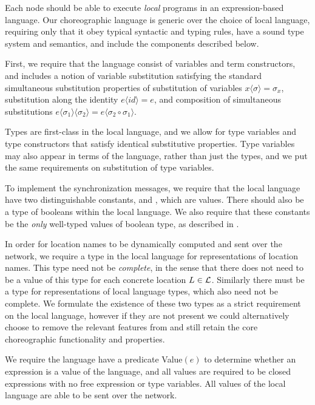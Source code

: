 Each node should be able to execute \emph{local} programs in an expression-based language.
Our choreographic language is generic over the choice of local language, requiring only that it obey typical syntactic and typing rules, have a sound type system and semantics, and include the components described below.

First, we require that the language consist of variables and term constructors, and includes a notion of variable substitution satisfying the standard simultaneous substitution properties of substitution of variables $x \langle \sigma \rangle = \sigma_x$, substitution along the identity $e \langle  id \rangle = e$, and composition of simultaneous substitutions $e \langle \sigma_1 \rangle \langle \sigma_2 \rangle = e \langle \sigma_2 \circ \sigma_1 \rangle$.

Types are first-class in the local language, and we allow for type variables and type constructors that satisfy identical substitutive properties.
Type variables may also appear in terms of the language, rather than just the types, and we put the same requirements on substitution of type variables.

To implement the synchronization messages, we require that the local language have two distinguishable constants, \True and \False, which are values.
There should also be a type \Bool of booleans within the local language.
We also require that these constants be the \emph{only} well-typed values of boolean type, as described in \todo.

In order for location names to be dynamically computed and sent over the network, we require a type \Loc in the local language for representations of location names.
This type need not be \emph{complete}, in the sense that there does not need to be a value of this type for each concrete location $L \in \mathcal{L}$.
Similarly there must be a type \Typ for representations of local language types, which also need not be complete.
We formulate the existence of these two types as a strict requirement on the local language, however if they are not present we could alternatively choose to remove the relevant features from \langname and still retain the core choreographic functionality and properties.

We require the language have a predicate Value$(e)$ to determine whether an expression is a value of the language, and all values are required to be closed expressions with no free expression or type variables.
All values of the local language are able to be sent over the network.

